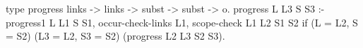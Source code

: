 \begin{elpicode}
  type progress links -> links -> subst -> subst -> o.
  progress L L3 S S3 :-
    progress1 L L1 S S1,
    occur-check-links L1,
    scope-check L1 L2 S1 S2
    if (L = L2, S = S2) (L3 = L2, S3 = S2)
       (progress L2 L3 S2 S3).
\end{elpicode}
